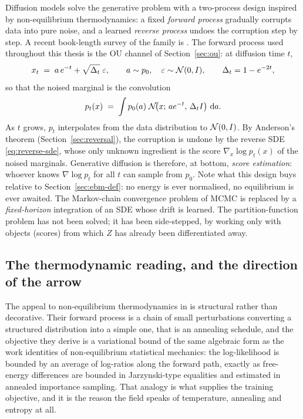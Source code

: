 Diffusion models \citep{sohl2015deep, ho2020denoising,
song2021scorebased} solve the generative problem with a two-process
design inspired by non-equilibrium thermodynamics: a fixed \emph{forward
process} gradually corrupts data into pure noise, and a learned
\emph{reverse process} undoes the corruption step by step. A recent
book-length survey of the family is \citet{lai2025principles}. The
forward process used throughout this thesis is the OU channel of
Section~\ref{sec:ou}: at diffusion time $t$,
\begin{equation}
  x_t \;=\; a\, e^{-t} + \sqrt{\Delta_t}\;\varepsilon,
  \qquad a \sim p_0,\quad \varepsilon \sim \mathcal{N}(0, I),
  \qquad \Delta_t = 1 - e^{-2t},
  \label{eq:forward-marginal}
\end{equation}
so that the noised marginal is the convolution
\begin{equation}
  p_t(x) \;=\; \int p_0(a)\; \mathcal{N}\!\big(x;\, a e^{-t},\, \Delta_t I\big)\,
  \,\mathrm{d} a .
  \label{eq:pt-convolution}
\end{equation}
As $t$ grows, $p_t$ interpolates from the data distribution to
$\mathcal{N}(0, I)$. By Anderson's theorem (Section~\ref{sec:reversal}), the
corruption is undone by the reverse SDE \eqref{eq:reverse-sde}, whose
only unknown ingredient is the score $\nabla_x \log p_t(x)$ of the noised
marginals. Generative diffusion is therefore, at bottom, \emph{score
estimation}: whoever knows $\nabla \log p_t$ for all $t$ can sample from
$p_0$. Note what this design buys relative to
Section~\ref{sec:ebm-def}: no energy is ever normalised, no equilibrium
is ever awaited. The Markov-chain convergence problem of MCMC is replaced
by a \emph{fixed-horizon} integration of an SDE whose drift is learned.
The partition-function problem has not been solved; it has been
side-stepped, by working only with objects (scores) from which $Z$ has
already been differentiated away.

\subsection{The thermodynamic reading, and the direction of the arrow}
\label{sec:diffusion-thermo}

The appeal to non-equilibrium thermodynamics in \citet{sohl2015deep} is
structural rather than decorative. Their forward process is a chain of small
perturbations converting a structured distribution into a simple one, that is
an annealing schedule, and the objective they derive is a variational bound of
the same algebraic form as the work identities of non-equilibrium statistical
mechanics: the log-likelihood is bounded by an average of log-ratios along the
forward path, exactly as free-energy differences are bounded in Jarzynski-type
equalities and estimated in annealed importance sampling. That analogy is what
supplies the training objective, and it is the reason the field speaks of
temperature, annealing and entropy at all.

